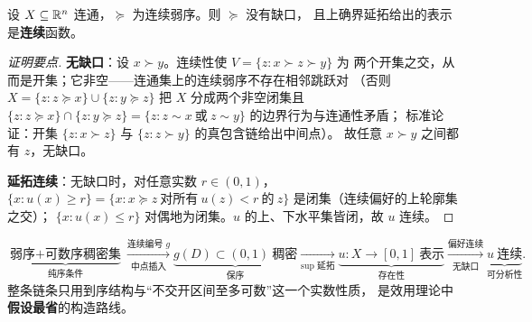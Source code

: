 \begin{theorem}[连续性恢复]\label{thm:u-cont}
设 $X\subseteq\mathbb{R}^n$ 连通，$\succeq$ 为连续弱序。则 $\succeq$ 没有缺口，
且上确界延拓给出的表示是\textbf{连续}函数。
\end{theorem}

\begin{proof}[证明要点]
\textbf{无缺口}：设 $x\succ y$。连续性使 $V=\{z:x\succ z\succ y\}$ 为
两个开集之交，从而是开集；它非空——连通集上的连续弱序不存在相邻跳跃对
（否则 $X=\{z:z\succeq x\}\cup\{z:y\succeq z\}$ 把 $X$ 分成两个非空闭集且
$\{z:z\succeq x\}\cap\{z:y\succeq z\}=\{z:z\sim x\ \text{或}\ z\sim y\}$ 的边界行为与连通性矛盾；
标准论证：开集 $\{z:x\succ z\}$ 与 $\{z:z\succ y\}$ 的真包含链给出中间点）。
故任意 $x\succ y$ 之间都有 $z$，无缺口。

\textbf{延拓连续}：无缺口时，对任意实数 $r\in(0,1)$，
$\{x:u(x)\ge r\}=\{x:x\succeq z\ \text{对所有}\ u(z)<r\ \text{的}\ z\}$
是闭集（连续偏好的上轮廓集之交）；
$\{x:u(x)\le r\}$ 对偶地为闭集。$u$ 的上、下水平集皆闭，故 $u$ 连续。
\end{proof}

\begin{remark}[连续编号法的全貌]
\[
\underbrace{\text{弱序}+\text{可数序稠密集}}_{\text{纯序条件}}
\xrightarrow[\text{中点插入}]{\text{连续编号 }g}
\underbrace{g(D)\subset(0,1)\ \text{稠密}}_{\text{保序}}
\xrightarrow[\sup\text{ 延拓}]{}
\underbrace{u:X\to[0,1]\ \text{表示}}_{\text{存在性}}
\xrightarrow[\text{无缺口}]{\text{偏好连续}}
\underbrace{u\ \text{连续}}_{\text{可分析性}}.
\]
整条链条只用到序结构与“不交开区间至多可数”这一个实数性质，
是效用理论中\textbf{假设最省}的构造路线。
\end{remark}
